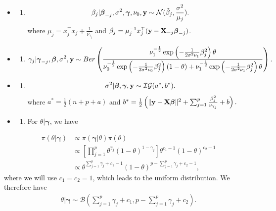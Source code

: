 \documentclass[]{book}
\providecommand{\tightlist}{%
  \setlength{\itemsep}{0pt}\setlength{\parskip}{0pt}}
\begin{document}
\begin{itemize}
\item
  \begin{enumerate}
  \def\labelenumi{\arabic{enumi})}
  \tightlist
  \item
    \[\beta_j|{\boldsymbol \beta}_{-j}, \sigma^2, {\boldsymbol \gamma}, \nu_0, {\bf y}\sim \mathcal{N}(\tilde{\beta}_j, \frac{\sigma^2}{\mu_j}).\]
    where \(\mu_j= x_j^{{\top}}x_j + \frac{1}{\nu_{\gamma_j}}\) and \(\tilde{\beta}_j = \mu_j^{-1}x_j^{{\top}}({\bf y}- {\bf X}_{-j}{\boldsymbol \beta}_{-j})\).
  \end{enumerate}
\item
  \begin{enumerate}
  \def\labelenumi{\arabic{enumi})}
  \setcounter{enumi}{1}
  \tightlist
  \item
    \begin{eqnarray}
        \gamma_j |{\boldsymbol \gamma}_{-j}, {\boldsymbol \beta}, \sigma^2, {\bf y}\sim Ber\left(\frac{ \nu_1^{-\frac{1}{2}}
            \exp\left(-\frac{1}{2\sigma^2\nu_1}\beta_j^2\right)\theta}
        {  \nu_0^{-\frac{1}{2}}\exp\left(-\frac{1}{2\sigma^2\nu_0}\beta_j^2\right)\left(1-\theta\right)+
            \nu_1^{-\frac{1}{2}}\exp\left(-\frac{1}{2\sigma^2\nu_1}\beta_j^2\right)\theta}\right).
    \end{eqnarray}
  \end{enumerate}
\item
  \begin{enumerate}
  \def\labelenumi{\arabic{enumi})}
  \setcounter{enumi}{2}
  \tightlist
  \item
    \[\sigma^2|{\boldsymbol \beta}, {\boldsymbol \gamma}, {\bf y}\sim \mathcal{IG}(a^*,b^*).\]
    where \(a^*=\frac{1}{2}(n+p+a)\) and \(b^* = \frac{1}{2}\left(\|{\bf y}-{\bf X}{\boldsymbol \beta}\|^2 + \sum_{j=1}^{p}\frac{\beta_j^2}{\nu_{\gamma_j}} + b\right).\)
  \end{enumerate}
\item
  \begin{enumerate}
  \def\labelenumi{\arabic{enumi})}
  \setcounter{enumi}{3}
  \tightlist
  \item
    For \(\theta|{\boldsymbol \gamma}\), we have
  \end{enumerate}
\end{itemize}

\begin{align}
        \pi(\theta|{\boldsymbol \gamma})&\propto \pi({\boldsymbol \gamma}|\theta) \pi(\theta) \nonumber \\
        &\propto\left[ \prod_{j=1}^p \theta^{\gamma_j}(1-\theta)^{1-\gamma_j}\right] \theta^{c_1-1}(1-\theta)^{c_2-1} \nonumber\\
        &\propto \theta^{\sum_{j=1}^p \gamma_j+c_1-1}(1-\theta)^{p-\sum_{j=1}^p \gamma_j+c_2-1},
\end{align}
where we will use \(c_1=c_2=1\), which leads to the uniform distribution.
We therefore have
\begin{eqnarray}
        \theta|{\boldsymbol \gamma}\sim \mathcal{B}\left(\sum_{j=1}^p \gamma_j+c_1,p-\sum_{j=1}^p \gamma_j+c_2\right).
\end{eqnarray}
\end{document}
